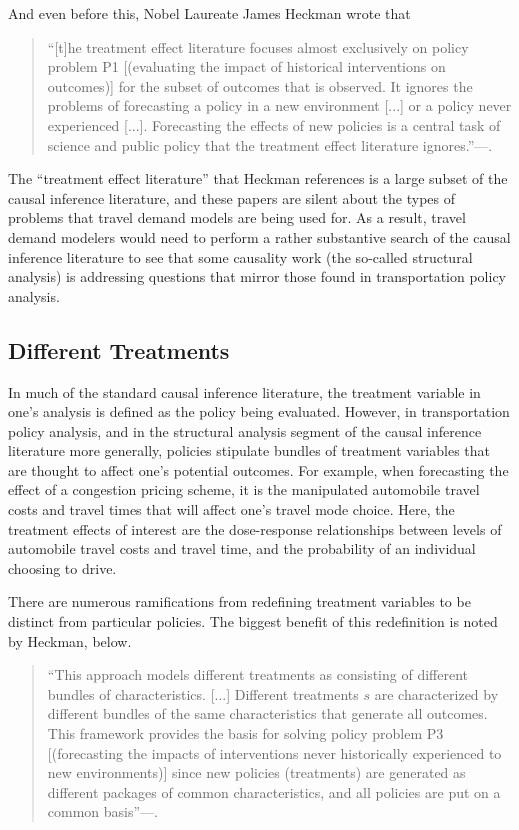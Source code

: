 And even before this, Nobel Laureate James Heckman wrote that
\begin{quotation}
``[t]he treatment effect literature focuses almost exclusively on policy problem P1 [(evaluating the impact of historical interventions on outcomes)] for the subset of outcomes that is observed. It ignores the problems of forecasting a policy in a new environment [...] or a policy never experienced [...]. Forecasting the effects of new policies is a central task of science and public policy that the treatment effect literature ignores.''---\citep{heckman2005scientific}.
\end{quotation}
The ``treatment effect literature'' that Heckman references is a large subset of the causal inference literature, and these papers are silent about the types of problems that travel demand models are being used for. As a result, travel demand modelers would need to perform a rather substantive search of the causal inference literature to see that some causality work (the so-called structural analysis) is addressing questions that mirror those found in transportation policy analysis.

\subsection{Different Treatments}
\label{sec:diff_treatments}
In much of the standard causal inference literature, the treatment variable in one's analysis is defined as the policy being evaluated. However, in transportation policy analysis, and in the structural analysis segment of the causal inference literature more generally, policies stipulate bundles of treatment variables that are thought to affect one's potential outcomes. For example, when forecasting the effect of a congestion pricing scheme, it is the manipulated automobile travel costs and travel times that will affect one's travel mode choice. Here, the treatment effects of interest are the dose-response relationships between levels of automobile travel costs and travel time, and the probability of an individual choosing to drive.

There are numerous ramifications from redefining treatment variables to be distinct from particular policies. The biggest benefit of this redefinition is noted by Heckman, below.
\begin{quotation}
``This approach models different treatments as consisting of different bundles of characteristics. [...] Different treatments $s$ are characterized by different bundles of the same characteristics that generate all outcomes. This framework provides the basis for solving policy problem P3 [(forecasting the impacts of interventions never historically experienced to new environments)] since new policies (treatments) are generated as different packages of common characteristics, and all policies are put on a common basis''---\citep{heckman2005scientific}.
\end{quotation}

